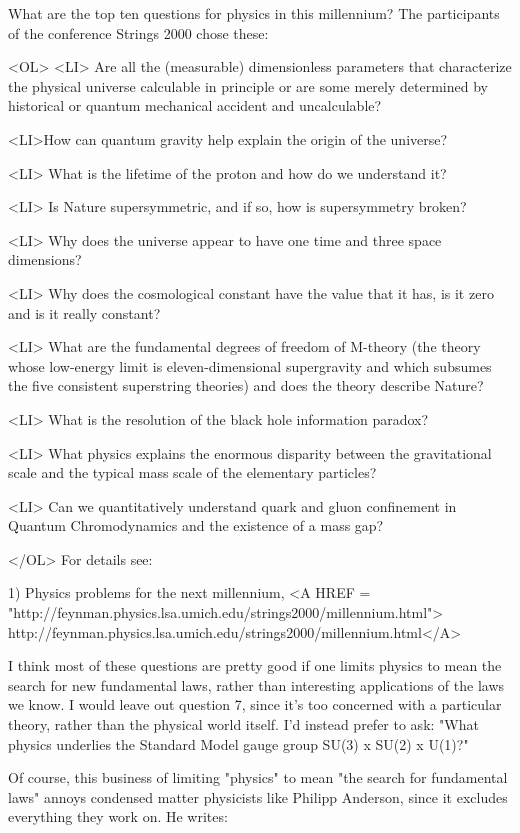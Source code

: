 


What are the top ten questions for physics in this millennium?  
The participants of the conference Strings 2000 chose these:

<OL>
<LI>
Are all the (measurable) dimensionless parameters that characterize 
the physical universe calculable in principle or are some merely
determined by historical or quantum mechanical accident and uncalculable? 

<LI>How can quantum gravity help explain the origin of the universe? 

<LI>
What is the lifetime of the proton and how do we understand it? 

<LI> Is Nature supersymmetric, and if so, how is supersymmetry broken? 

<LI> Why does the universe appear to have one time and three space dimensions? 

<LI> Why does the cosmological constant have the value that it has, is it 
zero and is it really constant? 

<LI> What are the fundamental degrees of freedom of M-theory (the theory 
whose low-energy limit is eleven-dimensional supergravity and
which subsumes the five consistent superstring theories) and does 
the theory describe Nature? 

<LI> What is the resolution of the black hole information paradox? 

<LI> What physics explains the enormous disparity between the gravitational 
scale and the typical mass scale of the elementary particles? 

<LI> Can we quantitatively understand quark and gluon confinement in 
Quantum Chromodynamics and the existence of a mass gap? 

</OL>
For details see:

1) Physics problems for the next millennium, 
<A HREF = "http://feynman.physics.lsa.umich.edu/strings2000/millennium.html">
http://feynman.physics.lsa.umich.edu/strings2000/millennium.html</A>

I think most of these questions are pretty good if one limits physics 
to mean the search for new fundamental laws, rather than interesting 
applications of the laws we know.  I would leave out question 7, since
it's too concerned with a particular theory, rather than the physical
world itself.  I'd instead prefer to ask: "What physics underlies the
Standard Model gauge group SU(3) x SU(2) x U(1)?"

Of course, this business of limiting "physics" to mean
"the search for fundamental laws" annoys condensed matter
physicists like Philipp Anderson, since it excludes everything they work
on.  He writes:

